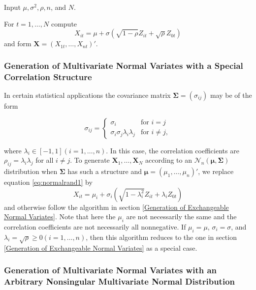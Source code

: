 Input $\mu, \sigma^2, \rho, n$, and $N$.

For $t=1,\ldots,N$ compute
\begin{equation} 
	X_{it} = \mu + \sigma \left(\sqrt{1-\rho} Z_{it} + \sqrt{\rho} Z_{0t}  \right) \label{eq:normalrand1}
\end{equation}
and form $\textbf{X} = (X_{1t},\ldots,X_{nt})'$.


\subsubsection{Generation of Multivariate Normal Variates with a Special Correlation Structure}
In certain statistical applications the covariance matrix $\boldsymbol{\Sigma} = (\sigma_{ij})$ may be of the form

\begin{equation}
	\sigma_{ij}=\begin{cases}
		\sigma_{i} & \text{for }i=j\\
		\sigma_{i} \sigma_{j} \lambda_{i} \lambda_{j}  & \text{for }i \neq j,
	\end{cases}
\end{equation}

where $\lambda_i \in [-1, 1] (i=1,\ldots,n)$. In this case, the correlation coefficients are $\rho_{ij} = \lambda_i \lambda_j$ for all $i \neq j$. To generate $\textbf{X}_1,\ldots, \textbf{X}_N$ according to an  $\mathcal{N}_n(\boldsymbol{\mu}, \boldsymbol{\Sigma})$ distribution when $\boldsymbol{\Sigma}$ has such a structure and $\boldsymbol{\mu} =(\mu_1,\ldots,\mu_n)'$, we replace equation \ref{eq:normalrand1} by
\begin{equation} 
	X_{it} = \mu_i + \sigma_i \left(\sqrt{1-\lambda_i^2} Z_{it} + \lambda_i Z_{0t}  \right) 
\end{equation}
and otherwise follow the algorithm in section \ref{Generation of Exchangeable Normal Variates}. Note that here the $\mu_i$ are not necessarily the same and the correlation coefficients are not necessarily all nonnegative. If $\mu_i=\mu$, $\sigma_i=\sigma$, and $\lambda_i=\sqrt{\rho} \geq 0 (i=1,\ldots,n)$, then this algorithm reduces to the one in section \ref{Generation of Exchangeable Normal Variates} as a special case.


\subsubsection{Generation of Multivariate Normal Variates with an Arbitrary Nonsingular Multivariate Normal Distribution}

